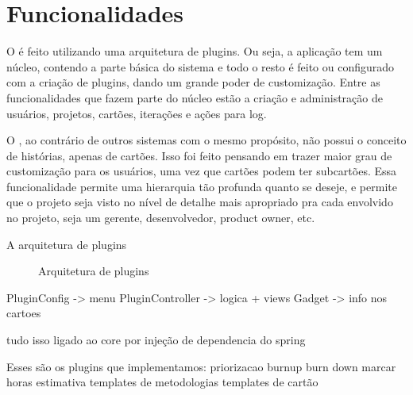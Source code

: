 \section{Funcionalidades}

O \calopsita é feito utilizando uma arquitetura de plugins. Ou seja, a aplicação tem um núcleo, contendo a parte básica do sistema e todo o resto é feito ou configurado com a criação de plugins, dando um grande poder de customização.
Entre as funcionalidades que fazem parte do núcleo estão a criação e administração de usuários,
projetos, cartões, iterações e ações para log.

O \calopsita, ao contrário de outros sistemas com o mesmo propósito, não possui o conceito de histórias, apenas de cartões. Isso foi feito pensando em trazer maior grau de customização para os usuários, uma vez que cartões podem ter subcartões. Essa funcionalidade permite uma hierarquia tão profunda quanto se deseje, e permite que o projeto seja visto no nível de detalhe mais apropriado pra cada envolvido no projeto, seja um gerente, desenvolvedor, product owner, etc.

A arquitetura de plugins

\begin{figure}[H]
  \centering
  \caption{Arquitetura de plugins}
\end{figure}

PluginConfig -> menu
PluginController -> logica + views
Gadget -> info nos cartoes

tudo isso ligado ao core por injeção de dependencia do spring


Esses são os plugins que implementamos:
priorizacao
burnup
burn down
marcar horas
estimativa
templates de metodologias
templates de cartão


